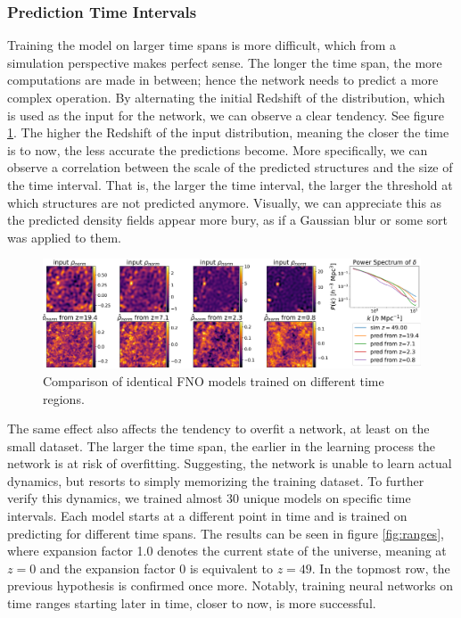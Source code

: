 \documentclass{article}
\begin{document}
\subsubsection{Prediction Time Intervals}
\label{timeintervals}

Training the model on larger time spans is more difficult, which from a simulation perspective makes perfect sense. The longer the time span, the more computations are made in between; hence the network needs to predict a more complex operation. By alternating the initial Redshift of the distribution, which is used as the input for the network, we can observe a clear tendency. See figure \ref{fig:IC-comp}. The higher the Redshift of the input distribution, meaning the closer the time is to now, the less accurate the predictions become. More specifically, we can observe a correlation between the scale of the predicted structures and the size of the time interval. That is, the larger the time interval, the larger the threshold at which structures are not predicted anymore.
Visually, we can appreciate this as the predicted density fields appear more bury, as if a Gaussian blur or some sort was applied to them. 

\begin{figure}[h]
    \centering
    \includegraphics[width=0.9\linewidth]{img/compare_larger_scales.png}
    \caption{Comparison of identical FNO models trained on different time regions.}
    \label{fig:IC-comp}
\end{figure}

The same effect also affects the tendency to overfit a network, at least on the small dataset. The larger the time span, the earlier in the learning process the network is at risk of overfitting. Suggesting, the network is unable to learn actual dynamics, but resorts to simply memorizing the training dataset. To further verify this dynamics, we trained almost 30 unique models on specific time intervals. Each model starts at a different point in time and is trained on predicting for different time spans. The results can be seen in figure \ref{fig:ranges}, where expansion factor 1.0 denotes the current state of the universe, meaning at $z = 0$ and the expansion factor 0 is equivalent to $z=49$. In the topmost row, the previous hypothesis is confirmed once more. Notably, training neural networks on time ranges starting later in time, closer to now, is more successful.
\end{document}
